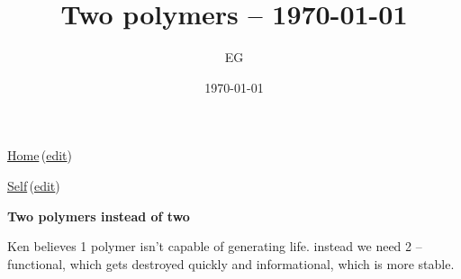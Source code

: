 \documentclass[12pt]{paper}
\title{Two polymers -- \today}
\author{EG}
\date{\today}
\newcommand{\wikilink}[2] { \href{#1.pdf}{#2}\,(\href{#1.tex}{edit})}
\begin{document}
 \maketitle
\wikilink{home}{Home}

\wikilink{twoPolymers}{Self}


 \begin{center}
  {\Large \textbf{Two polymers instead of two}}
 \end{center}
Ken believes 1 polymer isn't capable of generating life.
instead we need 2 -- functional, which gets destroyed quickly and informational, which is more 
stable.
\end{document}
